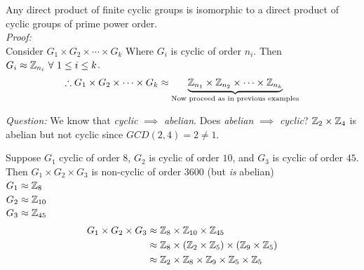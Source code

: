 \begin{corollary}
Any direct product of finite cyclic groups is isomorphic to a direct product of cyclic groups of prime power order. \steezybreak\\
\textit{Proof:}\\
Consider $G_1\times G_2 \times \cdots \times G_k$ Where $G_i$ is cyclic of order $n_i$. Then $G_i\approx {\mathbb{ Z}}_{n_i} \ \forall \ 1\leq i \leq k$.
\begin{align}
    \therefore G_1\times G_2\times \cdots \times G_k \approx \underbrace{{\mathbb{ Z}}_{n_1}\times {\mathbb{ Z}}_{n_2}\times \cdots \times {\mathbb{ Z}}_{n_k}}_{\text{Now proceed as in previous examples}} \nonumber
\end{align}
\end{corollary}

\textit{Question:} We know that \textit{cyclic} $\implies$ \textit{abelian}. Does \textit{abelian} $\implies$ \textit{cyclic}?  ${\mathbb{ Z}}_2\times {\mathbb{ Z}}_4$ is abelian but not cyclic since $GCD(2,4)=2\neq 1$.

\begin{example}
Suppose $G_1$ cyclic of order $8$, $G_2$ is cyclic of order $10$, and $G_3$ is cyclic of order $45$. \\ 
Then $G_1\times G_2\times G_3$ is non-cyclic of order $3600$ (but \textit{is} abelian) \\ 
$G_1\approx {\mathbb{ Z}}_8$ \\
$G_2 \approx {\mathbb{ Z}}_{10}$ \\
$G_3\approx {\mathbb{ Z}}_{45}$
\begin{align}
    G_1\times G_2\times G_3 &\approx {\mathbb{ Z}}_8\times {\mathbb{ Z}}_{10}\times {\mathbb{ Z}}_{45} \nonumber \\
    &\approx {\mathbb{ Z}}_8\times ({\mathbb{ Z}}_2\times {\mathbb{ Z}}_5)\times({\mathbb{ Z}}_9\times {\mathbb{ Z}}_5) \nonumber \\
    &\approx {\mathbb{ Z}}_2\times {\mathbb{ Z}}_8\times {\mathbb{ Z}}_9\times {\mathbb{ Z}}_5 \times {\mathbb{ Z}}_5 \nonumber
\end{align}
\end{example}

